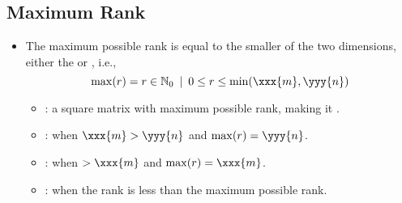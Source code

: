 \begin{itemize}
  \subsection{Maximum Rank}\label{Maximum Rank}
  \begin{itemize}
  \item The maximum possible rank is equal to the smaller of the two dimensions, either the  or , i.e.,
  \[%
  \max(r) = r \in \mathbb{N}_0~\,|~\,0 \leq r \leq \min(\xxx{m},\yyy{n})
  \]%
    \begin{itemize}
      \item {}: a square matrix with maximum possible rank, making it \hyperref[Matrix Inverse]{}. 
      \item {}: when \(\xxx{m} > \yyy{n}\) and \(\max(r) = \yyy{n}\). 
      \item {}: when \( > \xxx{m} \) and \(\max(r) = \xxx{m}\). 
      \item {}: when the rank is less than the maximum possible rank. 
    \end{itemize}
  \end{itemize}
\end{itemize}

